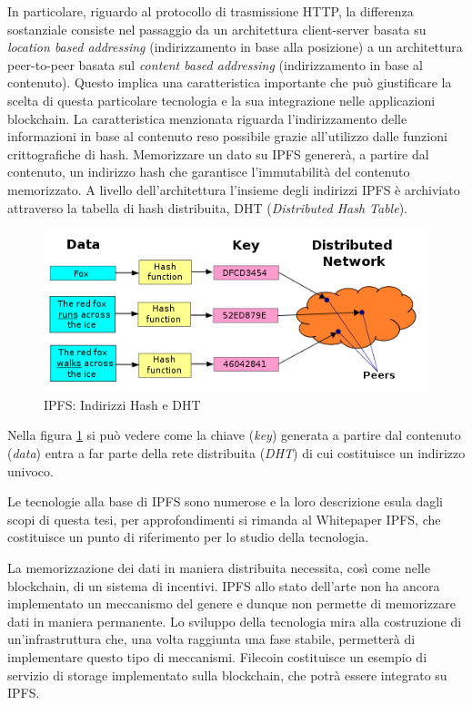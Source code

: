 In particolare, riguardo al protocollo di trasmissione HTTP, la differenza sostanziale consiste nel passaggio da un architettura client-server basata su \emph{location based addressing} (indirizzamento in base alla posizione) a un architettura peer-to-peer basata sul \emph{content based addressing} (indirizzamento in base al contenuto). Questo implica una caratteristica importante che può giustificare la scelta di questa particolare tecnologia e la sua integrazione nelle applicazioni blockchain. La caratteristica menzionata riguarda l'indirizzamento delle informazioni in base al contenuto reso possibile grazie all'utilizzo dalle funzioni crittografiche di hash. Memorizzare un dato su IPFS genererà, a partire dal contenuto, un indirizzo hash che garantisce l'immutabilità del contenuto memorizzato. A livello dell'architettura l'insieme degli indirizzi IPFS è archiviato attraverso la tabella di hash distribuita, DHT (\emph{Distributed Hash Table}). 

\begin{figure}[H]
\centering
\includegraphics[width=1\textwidth]{immagini/ipfsDHT.PNG}
\caption{IPFS: Indirizzi Hash e DHT}
\label{fig:ipfsDHT}
\end{figure}

Nella figura \ref{fig:ipfsDHT} si può vedere come la chiave (\emph{key}) generata a partire dal contenuto (\emph{data}) entra a far parte della rete distribuita (\emph{DHT}) di cui costituisce un indirizzo univoco. 

Le tecnologie alla base di IPFS sono numerose e la loro descrizione esula dagli scopi di questa tesi, per approfondimenti si rimanda al Whitepaper IPFS, che costituisce un punto di riferimento per lo studio della tecnologia. 

La memorizzazione dei dati in maniera distribuita necessita, così come nelle blockchain, di un sistema di incentivi. IPFS allo stato dell'arte non ha ancora implementato un meccanismo del genere e dunque non permette di memorizzare dati in maniera permanente. Lo sviluppo della tecnologia mira alla costruzione di un'infrastruttura che, una volta raggiunta una fase stabile, permetterà di implementare questo tipo di meccanismi. Filecoin costituisce un esempio di servizio di storage implementato sulla blockchain, che potrà essere integrato su IPFS.